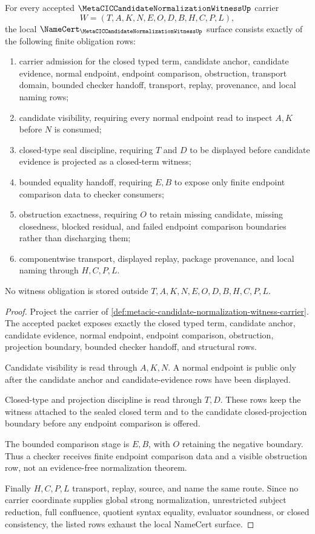 \begin{theorem}
\label{thm:metacic-candidate-normalization-witness-obligations}
For every accepted $\MetaCICCandidateNormalizationWitnessUp$ carrier
$$
W=(T,A,K,N,E,O,D,B,H,C,P,L),
$$
the local $\NameCert_{\MetaCICCandidateNormalizationWitnessUp}$ surface consists exactly of the following finite obligation rows:
\begin{enumerate}
\item carrier admission for the closed typed term, candidate anchor, candidate evidence, normal endpoint, endpoint comparison, obstruction, transport domain, bounded checker handoff, transport, replay, provenance, and local naming rows;
\item candidate visibility, requiring every normal endpoint read to inspect $A,K$ before $N$ is consumed;
\item closed-type seal discipline, requiring $T$ and $D$ to be displayed before candidate evidence is projected as a closed-term witness;
\item bounded equality handoff, requiring $E,B$ to expose only finite endpoint comparison data to checker consumers;
\item obstruction exactness, requiring $O$ to retain missing candidate, missing closedness, blocked residual, and failed endpoint comparison boundaries rather than discharging them;
\item componentwise transport, displayed replay, package provenance, and local naming through $H,C,P,L$.
\end{enumerate}
No witness obligation is stored outside $T,A,K,N,E,O,D,B,H,C,P,L$.
\end{theorem}
\begin{proof}
Project the carrier of \autoref{def:metacic-candidate-normalization-witness-carrier}. The accepted packet exposes exactly the closed typed term, candidate anchor, candidate evidence, normal endpoint, endpoint comparison, obstruction, projection boundary, bounded checker handoff, and structural rows.

Candidate visibility is read through $A,K,N$. A normal endpoint is public only after the candidate anchor and candidate-evidence rows have been displayed.

Closed-type and projection discipline is read through $T,D$. These rows keep the witness attached to the sealed closed term and to the candidate closed-projection boundary before any endpoint comparison is offered.

The bounded comparison stage is $E,B$, with $O$ retaining the negative boundary. Thus a checker receives finite endpoint comparison data and a visible obstruction row, not an evidence-free normalization theorem.

Finally $H,C,P,L$ transport, replay, source, and name the same route. Since no carrier coordinate supplies global strong normalization, unrestricted subject reduction, full confluence, quotient syntax equality, evaluator soundness, or closed consistency, the listed rows exhaust the local NameCert surface.
\end{proof}

